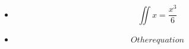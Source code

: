 \documentclass[main.tex]{subfiles}
\begin{document}
\begin{itemize}

    \item
        \begin{equation}
        \iint x = \frac{x^3}{6}
        \end{equation}
    \item
        \begin{equation}
        Other equation
        \end{equation}

\end{itemize}
\end{document}

